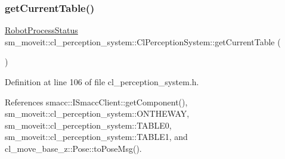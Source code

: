 \mbox{\label{classsm__moveit_1_1cl__perception__system_1_1ClPerceptionSystem_a2eb71e292ac7aca0c71dc71d84f38bea}} 
\subsubsection{\texorpdfstring{get\+Current\+Table()}{getCurrentTable()}}
{\footnotesize\ttfamily \hyperlink{namespacesm__moveit_1_1cl__perception__system_a730c3fd4da64d10a75ca4ab014fdbe40}{Robot\+Process\+Status} sm\+\_\+moveit\+::cl\+\_\+perception\+\_\+system\+::\+Cl\+Perception\+System\+::get\+Current\+Table (\begin{DoxyParamCaption}{ }\end{DoxyParamCaption})\hspace{0.3cm}{\ttfamily [inline]}}



Definition at line 106 of file cl\+\_\+perception\+\_\+system.\+h.



References smacc\+::\+I\+Smacc\+Client\+::get\+Component(), sm\+\_\+moveit\+::cl\+\_\+perception\+\_\+system\+::\+O\+N\+T\+H\+E\+W\+AY, sm\+\_\+moveit\+::cl\+\_\+perception\+\_\+system\+::\+T\+A\+B\+L\+E0, sm\+\_\+moveit\+::cl\+\_\+perception\+\_\+system\+::\+T\+A\+B\+L\+E1, and cl\+\_\+move\+\_\+base\+\_\+z\+::\+Pose\+::to\+Pose\+Msg().



